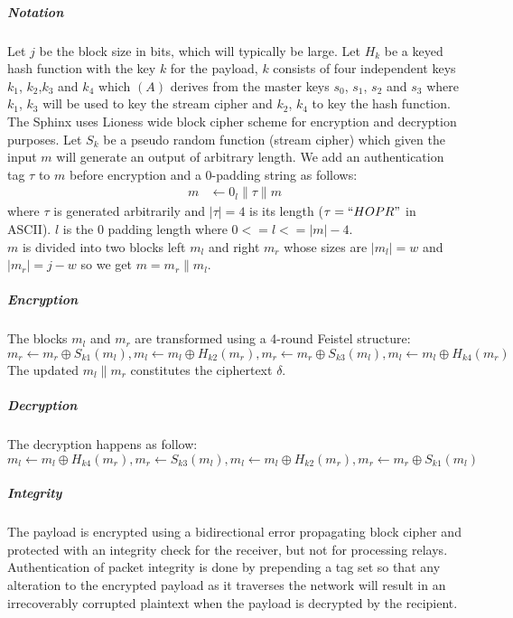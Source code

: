 \subparagraph{Notation}
Let $j$ be the block size in bits, which will typically be large. Let $H_k$ be a keyed hash function with the key $k$ for the payload, $k$ consists of four independent keys $k_1$, $k_2$,$k_3$ and $k_4$ which $(A)$ derives from the master keys $s_0$, $s_1$, $s_2$ and $s_3$ where $k_1$, $k_3$ will be used to key the stream cipher and $k_2$, $k_4$ to key the hash function. The Sphinx uses Lioness wide block cipher scheme for encryption and decryption purposes.
Let $S_k$ be a pseudo random function (stream cipher) which given the input $m$ will generate an output of arbitrary length. We add an authentication tag $\tau$ to $m$ before encryption and a 0-padding string as follows:
\begin{align}
   m &\leftarrow 0_{l} \|\tau\|m
    \end{align}
where $\tau$ is generated arbitrarily and $|\tau|=4$ is its length ($\tau=``HOPR "$ in ASCII). $l$ is the $0$ padding length where
$0 <= l <= |m| - 4$.
\\$m$ is divided into two blocks left $m_l$ and right $m_r$ whose sizes are $|m_l|=w$ and $|m_r|=j-w$ so we get $m=m_r\|m_l$.
\subparagraph{Encryption}
The blocks $m_l$ and $m_r$ are transformed using a 4-round Feistel structure:
$$m_r\leftarrow m_r \oplus S_{k1}(m_l), m_l\leftarrow m_l \oplus H_{k2}(m_r), m_r\leftarrow m_r\oplus S_{k3}(m_l), m_l\leftarrow m_l\oplus H_{k4}(m_r)$$
The updated $m_l\|m_r$ constitutes the ciphertext $\delta$.
\subparagraph{Decryption} The decryption happens as follow:
$$m_l\leftarrow m_l\oplus H_{k4}(m_r), m_r\leftarrow S_{k3}(m_l), m_l\leftarrow m_l\oplus H_{k2}(m_r), m_r\leftarrow m_r\oplus S_{k1}(m_l)$$
\subparagraph{Integrity}
The payload is encrypted using a bidirectional error propagating block cipher
and protected with an integrity check for the receiver, but not
for processing relays. Authentication of packet integrity is done by prepending a tag set so that any alteration to the encrypted payload as it traverses the network will result in an irrecoverably corrupted plaintext when the payload is decrypted by the recipient.

